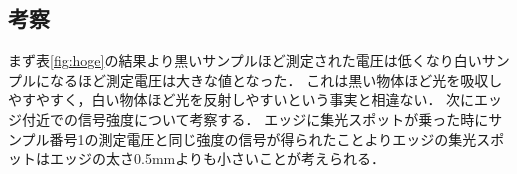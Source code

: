 \documentclass[11pt, a4paper,twocolumn]{jarticle}
\begin{document}
\newpage


\subsection{考察}
まず表\ref{fig:hoge}の結果より黒いサンプルほど測定された電圧は低くなり白いサンプルになるほど測定電圧は大きな値となった．
これは黒い物体ほど光を吸収しやすやすく，白い物体ほど光を反射しやすいという事実と相違ない．
次にエッジ付近での信号強度について考察する．
エッジに集光スポットが乗った時にサンプル番号1の測定電圧と同じ強度の信号が得られたことよりエッジの集光スポットはエッジの太さ0.5mmよりも小さいことが考えられる．


\newpage
\end{document}
